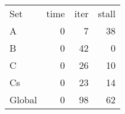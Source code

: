 \begin{tabular}{|l|r|r|r|}
\hline
Set & time & iter & stall \\

A & 0 & 7 & 38 \\

B & 0 & 42 & 0 \\

C & 0 & 26 & 10 \\

Cs & 0 & 23 & 14 \\

Global & 0 & 98 & 62 \\

\hline
\end{tabular}

